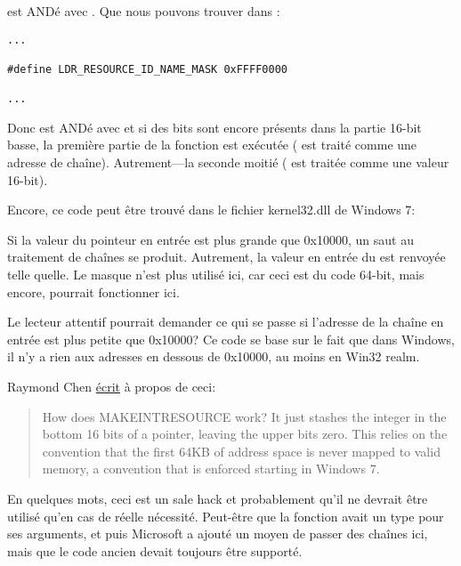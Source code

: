  est ANDé avec . Que nous pouvons trouver
dans :

\begin{lstlisting}[style=customc]
...

#define LDR_RESOURCE_ID_NAME_MASK 0xFFFF0000

...
\end{lstlisting}

Donc  est ANDé avec  et si des bits sont encore présents
dans la partie 16-bit basse, la première partie de la fonction est exécutée ( 
est traité comme une adresse de chaîne).
Autrement---la seconde moitié ( est traitée comme une valeur 16-bit).

Encore, ce code peut être trouvé dans le fichier kernel32.dll de Windows 7:



Si la valeur du pointeur en entrée est plus grande que 0x10000, un saut au traitement
de chaînes se produit.
Autrement, la valeur en entrée du  est renvoyée telle quelle.
Le masque  n'est plus utilisé ici, car ceci est du code 64-bit, mais
encore,  pourrait fonctionner ici.

Le lecteur attentif pourrait demander ce qui se passe si l'adresse de la chaîne en
entrée est plus petite que 0x10000?
Ce code se base sur le fait que dans Windows, il n'y a rien aux adresses en dessous
de 0x10000, au moins en Win32 realm.

Raymond Chen \href{https://blogs.msdn.microsoft.com/oldnewthing/20130925-00/?p=3123}{écrit} à propos de ceci:

\begin{framed}
\begin{quotation}
How does MAKE­INT­RESOURCE work? It just stashes the integer in the bottom 16 bits of a pointer, leaving the upper bits zero. This relies on the convention that the first 64KB of address space is never mapped to valid memory, a convention that is enforced starting in Windows 7.
\end{quotation}
\end{framed}

En quelques mots, ceci est un sale hack et probablement qu'il ne devrait être utilisé
qu'en cas de réelle nécessité.
Peut-être que la fonction  avait un type  pour ses arguments,
et puis Microsoft a ajouté un moyen de passer des chaînes ici, mais que le code ancien
devait toujours être supporté.

